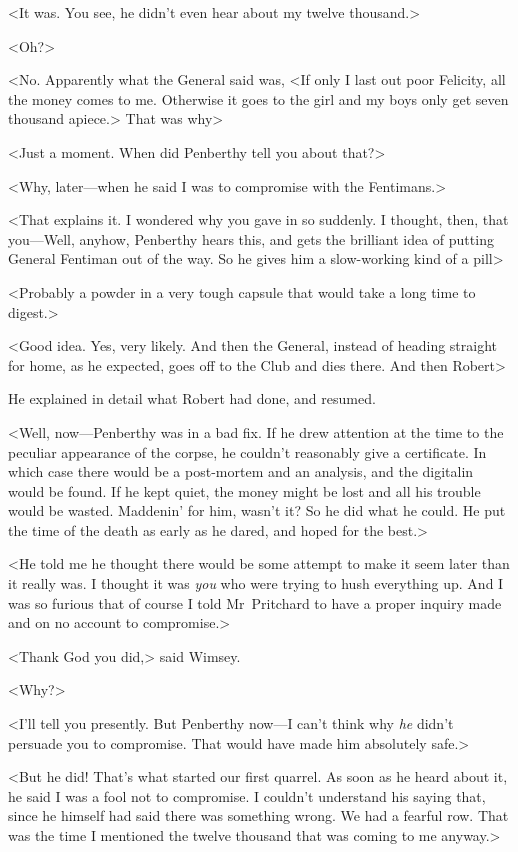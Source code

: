 <It was. You see, he didn't even hear about my twelve thousand.>

<Oh?>

<No. Apparently what the General said was, <If only I last out poor Felicity, all the money comes to me. Otherwise it goes to the girl and my boys only get seven thousand apiece.> That was why\longdash>

<Just a moment. When did Penberthy tell you about that?>

<Why, later—when he said I was to compromise with the Fentimans.>

<That explains it. I wondered why you gave in so suddenly. I thought, then, that you—Well, anyhow, Penberthy hears this, and gets the brilliant idea of putting General Fentiman out of the way. So he gives him a slow-working kind of a pill\longdash>

<Probably a powder in a very tough capsule that would take a long time to digest.>

<Good idea. Yes, very likely. And then the General, instead of heading straight for home, as he expected, goes off to the Club and dies there. And then Robert\longdash>

He explained in detail what Robert had done, and resumed.

<Well, now—Penberthy was in a bad fix. If he drew attention at the time to the peculiar appearance of the corpse, he couldn't reasonably give a certificate. In which case there would be a post-mortem and an analysis, and the digitalin would be found. If he kept quiet, the money might be lost and all his trouble would be wasted. Maddenin' for him, wasn't it? So he did what he could. He put the time of the death as early as he dared, and hoped for the best.>

<He told me he thought there would be some attempt to make it seem later than it really was. I thought it was \emph{you} who were trying to hush everything up. And I was so furious that of course I told Mr~Pritchard to have a proper inquiry made and on no account to compromise.>

<Thank God you did,> said Wimsey.

<Why?>

<I'll tell you presently. But Penberthy now—I can't think why \emph{he} didn't persuade you to compromise. That would have made him absolutely safe.>

<But he did! That's what started our first quarrel. As soon as he heard about it, he said I was a fool not to compromise. I couldn't understand his saying that, since he himself had said there was something wrong. We had a fearful row. That was the time I mentioned the twelve thousand that was coming to me anyway.>

